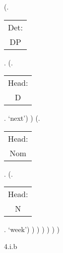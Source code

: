 \documentclass[12pt,letterpaper]{article}
\begin{document}
\begin{figure}
\begin{center}
\begin{parsetree}
			(.\begin{tabular}{c}Det:\\DP\end{tabular}.
			(.\begin{tabular}{c}Head:\\D\end{tabular}. `next')
			)
			(.\begin{tabular}{c}Head:\\Nom\end{tabular}.
			(.\begin{tabular}{c}Head:\\N\end{tabular}. `week')										)
			)
			)
			)
			)
			)
			
			\hfill \break\hfill \break
		\end{parsetree}
		4.i.b
	\end{center}
\end{figure}
\end{document}
